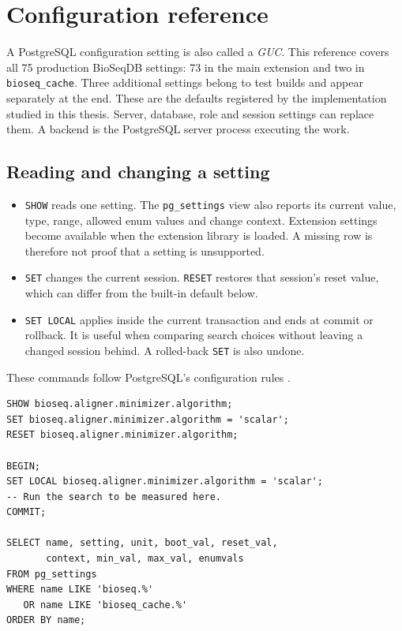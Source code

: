 \section{Configuration reference}
\label{sec:appendix-configuration}

A PostgreSQL configuration setting is also called a \emph{GUC}. This reference
covers all 75 production BioSeqDB settings: 73 in the main extension and two in
\texttt{bioseq\_cache}. Three additional settings belong to test builds and appear
separately at the end. These are the defaults registered by the implementation
studied in this thesis. Server, database, role and session settings can replace
them. A backend is the PostgreSQL server process executing the work.

\subsection{Reading and changing a setting}

\begin{itemize}
  \item \texttt{SHOW} reads one setting. The \texttt{pg\_settings} view also
    reports its current value, type, range, allowed enum values and change
    context. Extension settings become available when the extension library is
    loaded. A missing row is therefore not proof that a setting is unsupported.
  \item \texttt{SET} changes the current session. \texttt{RESET} restores that
    session's reset value, which can differ from the built-in default below.
  \item \texttt{SET LOCAL} applies inside the current transaction and ends at
    commit or rollback. It is useful when comparing search choices without
    leaving a changed session behind. A rolled-back \texttt{SET} is also undone.
\end{itemize}
These commands follow PostgreSQL's configuration rules
\autocite{postgresql17_set,postgresql17_pg_settings}.

\par\noindent\begin{minipage}{\linewidth}
\begin{lstlisting}[style=bioseq-appendix-sql,
  caption={Inspect a default and limit a change to one transaction.},
  label={lst:appendix-guc-session}]
SHOW bioseq.aligner.minimizer.algorithm;
SET bioseq.aligner.minimizer.algorithm = 'scalar';
RESET bioseq.aligner.minimizer.algorithm;

BEGIN;
SET LOCAL bioseq.aligner.minimizer.algorithm = 'scalar';
-- Run the search to be measured here.
COMMIT;

SELECT name, setting, unit, boot_val, reset_val,
       context, min_val, max_val, enumvals
FROM pg_settings
WHERE name LIKE 'bioseq.%'
   OR name LIKE 'bioseq_cache.%'
ORDER BY name;
\end{lstlisting}
\end{minipage}

